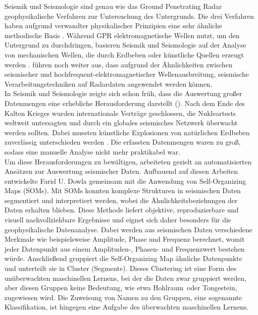 \noindent Seismik und Seismologie sind genau wie das Ground Penetrating Radar geophysikalische Verfahren zur Untersuchung des Untergrunds. Die drei Verfahren haben aufgrund verwandter physikalischer Prinzipien eine sehr ähnliche methodische Basis \parencite{forte_review_2017}. Während GPR elektromagnetische Wellen nutzt, um den Untergrund zu durchdringen, basieren Seismik und Seismologie auf der Analyse von mechanischen Wellen, die durch Erdbeben oder künstliche Quellen erzeugt werden \parencite{carcione_acoustic-electromagnetic_1995}. \textcite{forte_review_2017} führen noch weiter aus, dass aufgrund der Ähnlichkeiten zwischen seismischer und hochfrequent-elektromagnetischer Wellenausbreitung, seismische Verarbeitungstechniken auf Radardaten angewendet werden können. \\
In Seismik und Seismologie zeigte sich schon früh, dass die Auswertung großer Datenmengen eine erhebliche Herausforderung darstellt (\cite{dowla_seismic_1990}). Nach dem Ende des Kalten Krieges wurden internationale Verträge geschlossen, die Nukleartests weltweit untersagten und durch ein globales seismisches Netzwerk überwacht werden sollten. Dabei mussten künstliche Explosionen von natürlichen Erdbeben zuverlässig unterschieden werden \parencite{dahlmann_monitoring_1977}. Die erfassten Datenmengen waren zu groß, sodass eine manuelle Analyse nicht mehr praktikabel war. \\
Um diese Herausforderungen zu bewältigen, arbeiteten \textcite{dowla_seismic_1990} gezielt an automatisierten Ansätzen zur Auswertung seismischer Daten. Aufbauend auf diesen Arbeiten entwickelte Farid U. Dowla gemeinsam mit \textcite{maurer_seismic_1992} die Anwendung von Self-Organizing Maps (SOMs). Mit SOMs konnten komplexe Strukturen in seismischen Daten segmentiert und interpretiert werden, wobei die Ähnlichkeitsbeziehungen der Daten erhalten blieben. Diese Methode liefert objektive, reproduzierbare und visuell nachvollziehbare Ergebnisse und eignet sich daher besonders für die geophysikalische Datenanalyse. Dabei werden aus seismischen Daten verschiedene Merkmale wie beispielsweise Amplitude, Phase und Frequenz berechnet, womit jeder Datenpunkt aus einem Amplituden-, Phasen- und Frequenzwert bestehen würde. Anschließend gruppiert die Self-Organizing Map ähnliche Datenpunkte und unterteilt sie in Cluster (Segmente). Dieses Clustering ist eine Form des unüberwachten maschinellen Lernens, bei der die Daten zwar gruppiert werden, aber diesen Gruppen keine Bedeutung, wie etwa \glqq Hohlraum\grqq \, oder \glqq Tongestein\grqq, zugewiesen wird. Die Zuweisung von Namen zu den Gruppen, eine sogenannte Klassifikation, ist hingegen eine Aufgabe des überwachten maschinellen Lernens.

